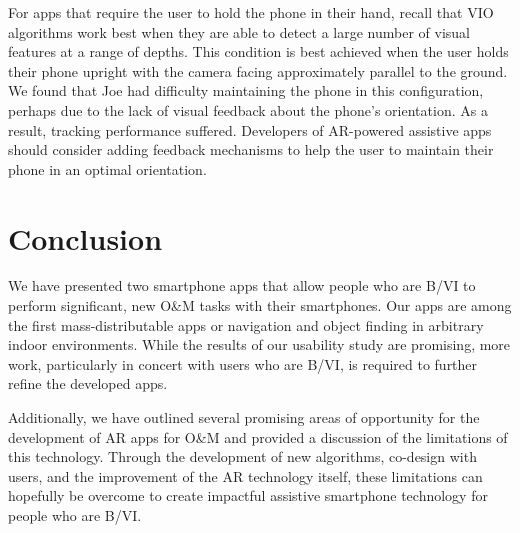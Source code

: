 \documentclass[chi_draft]{sigchi}
\newcommand{\BVI}{B/VI\xspace}
\newcommand{\OM}{O\&M\xspace}
\begin{document}
For apps that require the user to hold the phone in their hand, recall that VIO algorithms work best when they are able to detect a large number of visual features at a range of depths.  This condition is best achieved when the user holds their phone upright with the camera facing approximately parallel to the ground.  We found that Joe had difficulty maintaining the phone in this configuration, perhaps due to the lack of visual feedback about the phone's orientation.  As a result, tracking performance suffered.  Developers of AR-powered assistive apps should consider adding feedback mechanisms to help the user to maintain their phone in an optimal orientation. 
\balance{}

\section{Conclusion}
We have presented two smartphone apps that allow people who are \BVI to perform significant, new \OM tasks with their smartphones.  Our apps are among the first mass-distributable apps or navigation and object finding in arbitrary indoor environments.  While the results of our usability study are promising, more work, particularly in concert with users who are \BVI, is required to further refine the developed apps.

Additionally, we have outlined several promising areas of opportunity for the development of AR apps for \OM and provided a discussion of the limitations of this technology.  Through the development of new algorithms, co-design with users, and the improvement of the AR technology itself, these limitations can hopefully be overcome to create impactful assistive smartphone technology for people who are \BVI.  
%


\newpage


\end{document}
